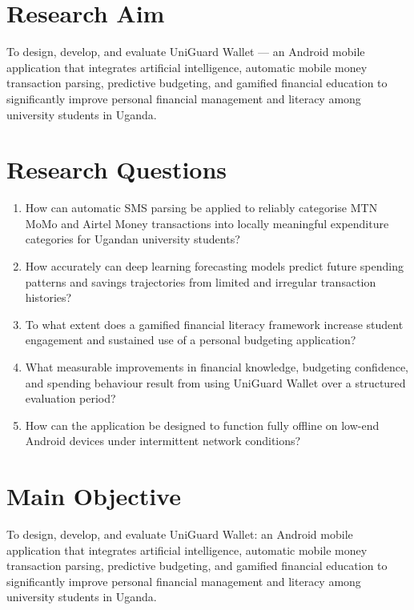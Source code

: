 \documentclass[12pt,a4paper]{report}
\begin{document}
\section{Research Aim}

To design, develop, and evaluate UniGuard Wallet --- an Android mobile application
that integrates artificial intelligence, automatic mobile money transaction parsing,
predictive budgeting, and gamified financial education to significantly improve personal
financial management and literacy among university students in Uganda.

\section{Research Questions}

\begin{enumerate}
    \item How can automatic SMS parsing be applied to reliably categorise MTN MoMo and Airtel Money transactions into locally meaningful expenditure categories for Ugandan university students?
    \item How accurately can deep learning forecasting models predict future spending patterns and savings trajectories from limited and irregular transaction histories?
    \item To what extent does a gamified financial literacy framework increase student engagement and sustained use of a personal budgeting application?
    \item What measurable improvements in financial knowledge, budgeting confidence, and spending behaviour result from using UniGuard Wallet over a structured evaluation period?
    \item How can the application be designed to function fully offline on low-end Android devices under intermittent network conditions?
\end{enumerate}

\section{Main Objective}

To design, develop, and evaluate UniGuard Wallet: an Android mobile application that
integrates artificial intelligence, automatic mobile money transaction parsing, predictive
budgeting, and gamified financial education to significantly improve personal financial
management and literacy among university students in Uganda.
\end{document}
